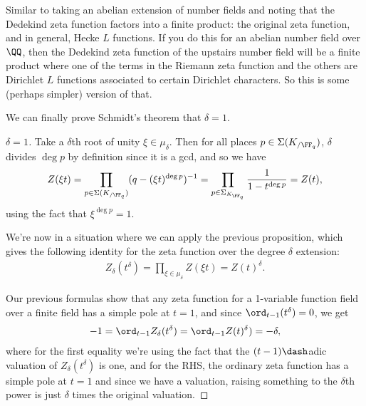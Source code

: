 \begin{remark}

Similar to taking an abelian extension of number fields and noting that
the Dedekind zeta function factors into a finite product: the original
zeta function, and in general, Hecke \(L\) functions. If you do this for
an abelian number field over \(\QQ\), then the Dedekind zeta function of
the upstairs number field will be a finite product where one of the
terms in the Riemann zeta function and the others are Dirichlet \(L\)
functions associated to certain Dirichlet characters. So this is some
(perhaps simpler) version of that.

\end{remark}

We can finally prove Schmidt's theorem that \(\delta = 1\).

\begin{proof}[$\delta = 1$]

Take a \(\delta\)th root of unity \(\xi \in \mu_\delta\). Then for all
places \(p \in \Sigma(K_{/\FF_q})\), \(\delta\) divides \(\deg p\) by
definition since it is a gcd, and so we have
\begin{align*}  
Z(\xi t) 
= \prod_{p\in \Sigma(K_{/\FF_q})} (q - (\xi t)^{\deg p} )^{-1} 
= \prod_{p\in \Sigma_{K_{\FF_q}}} {1 \over 1 - t^{\deg p}} = Z(t)
,\end{align*} using the fact that \(\xi^{\deg p} = 1\).

We're now in a situation where we can apply the previous proposition,
which gives the following identity for the zeta function over the degree
\(\delta\) extension:
\begin{align*}  
Z_{\delta}(t^\delta) = \prod_{\xi \in \mu_\delta} Z(\xi t) = Z(t)^\delta
.\end{align*}

Our previous formulas show that any zeta function for a 1-variable
function field over a finite field has a simple pole at \(t=1\), and
since \(\ord_{t-1}(t^\delta) = 0\), we get
\begin{align*}  
-1 = \ord_{t-1} Z_\delta(t^\delta) = \ord_{t-1} Z(t)^\delta) = -\delta
,\end{align*} where for the first equality we're using the fact that the
\((t-1)\dash\)adic valuation of \(Z_\delta(t^\delta)\) is one, and for
the RHS, the ordinary zeta function has a simple pole at \(t=1\) and
since we have a valuation, raising something to the \(\delta\)th power
is just \(\delta\) times the original valuation.

\end{proof}

